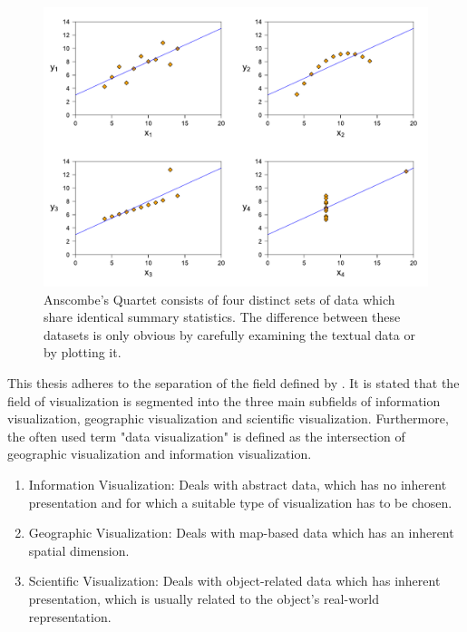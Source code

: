 \begin{figure}[tp]
\centering
\includegraphics[keepaspectratio,width=\linewidth,height=\fullh / 3]{diagrams/anscombe.pdf}
\caption[Anscombe's Quartet]{
  Anscombe's Quartet consists of four distinct sets of data which share identical summary statistics.
  The difference between these datasets is only obvious by carefully examining the textual data or by plotting it.
}
\label{fig:AnscombesQuartet}
\end{figure}

This thesis adheres to the separation of the field defined by \cite{IVISCourseNotes}. 
It is stated that the field of visualization is segmented into the three main subfields of information visualization, geographic visualization and scientific visualization. 
Furthermore, the often used term "data visualization" is defined as the intersection of geographic visualization and information visualization.

\begin{enumerate}
\item Information Visualization: Deals with abstract data, which has no inherent presentation and for which a suitable type of visualization has to be chosen.
\item Geographic Visualization: Deals with map-based data which has an inherent spatial dimension. 
\item Scientific Visualization: Deals with object-related data which has inherent presentation, which is usually related to the object's real-world representation.
\end{enumerate}

